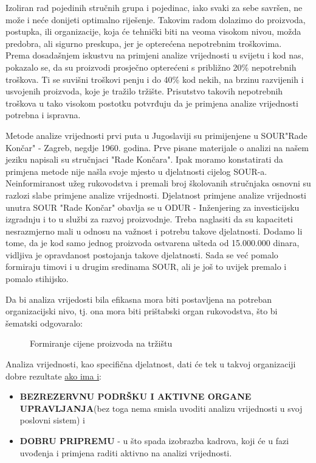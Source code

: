 \documentclass[a4paper,12pt]{article}
\numberwithin{figure}{section}
\begin{document}
Izoliran rad pojedinih stručnih grupa i pojedinac, iako svaki za sebe savršen, ne može i neće donijeti optimalno riješenje. Takovim radom dolazimo do proizvoda, postupka, ili organizacije, koja će tehnički biti na veoma visokom nivou, možda predobra, ali sigurno preskupa, jer je opterećena nepotrebnim troškovima.\\
Prema dosadašnjem iskustvu na primjeni analize vrijednosti u svijetu i kod nas, pokazalo se, da su proizvodi prosječno opterećeni s približno 20\% nepotrebnih troškova. Ti se suvišni troškovi penju i do 40\% kod nekih, na brzinu razvijenih i usvojenih proizvoda, koje je tražilo tržište. Prisutstvo takovih nepotrebnih troškova u tako visokom postotku potvrđuju da je primjena analize vrijednosti potrebna i ispravna.\par
Metode analize vrijednosti prvi puta u Jugoslaviji su primijenjene u SOUR"Rade Končar" - Zagreb, negdje 1960. godina. Prve pisane materijale o analizi na našem jeziku napisali su stručnjaci "Rade Končara". Ipak moramo konstatirati da primjena metode nije našla svoje mjesto u djelatnosti cijelog SOUR-a. Neinformiranost užeg rukovodstva i premali broj školovanih stručnjaka osnovni su razlozi slabe primjene analize vrijednosti. Djelatnost primjene analize vrijednosti unutra SOUR "Rade Končar" obavlja se u ODUR - Inženjering za investicijsku izgradnju i to u službi za razvoj proizvodnje. Treba naglasiti da su kapaciteti nesrazmjerno mali u odnosu na važnost i potrebu takove djelatnosti. Dodamo li tome, da je kod samo jednog proizvoda ostvarena ušteda od 15.000.000 dinara, vidljiva je opravdanost postojanja takove djelatnosti. Sada se već pomalo formiraju timovi i u drugim sredinama SOUR, ali je još to uvijek premalo i pomalo stihijsko. \par
Da bi analiza vrijedosti bila efikasna mora biti postavljena na potreban organizacijski nivo, tj. ona mora biti prištabski organ rukovodstva, što bi šematski odgovaralo:
\begin{figure}
\centering
 
\caption{Formiranje cijene proizvoda na tržištu}\label{Slika1}
\end{figure}
Analiza vrijednosti, kao specifična djelatnost, dati će tek u takvoj organizaciji dobre rezultate \underline{ako ima i}:
\begin{itemize}
\item \textbf{BEZREZERVNU PODRŠKU I AKTIVNE ORGANE UPRAVLJANJA}(bez toga nema smisla uvoditi analizu vrijednosti u svoj poslovni sistem) i
\item \textbf{DOBRU PRIPREMU} - u što spada izobrazba kadrova, koji će u fazi uvođenja i primjena raditi aktivno na analizi vrijednosti.
\end{itemize}
\newpage
\end{document}
